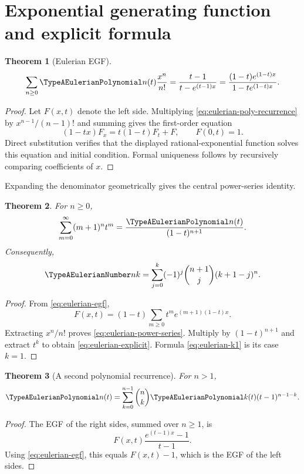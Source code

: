 \documentclass[11pt,a4paper,oneside,openany]{book}
\newtheorem{theorem}{Theorem}[chapter]
\theoremstyle{definition}
\theoremstyle{remark}
\begin{document}
\section{Exponential generating function and explicit formula}
\begin{theorem}[Eulerian EGF]\label{thm:eulerian-egf}
\begin{equation}\label{eq:eulerian-egf}
 \sum_{n\ge0}\TypeAEulerianPolynomial n(t)\frac{x^n}{n!}
 =\frac{t-1}{t-e^{(t-1)x}}
 =\frac{(1-t)e^{(1-t)x}}{1-te^{(1-t)x}}.
\end{equation}
\end{theorem}
\begin{proof}
Let $F(x,t)$ denote the left side.  Multiplying
\eqref{eq:eulerian-poly-recurrence} by $x^{n-1}/(n-1)!$ and summing gives the
first-order equation
\[
 (1-tx)F_x=t(1-t)F_t+F,
 \qquad F(0,t)=1.
\]
Direct substitution verifies that the displayed rational-exponential function
solves this equation and initial condition.  Formal uniqueness follows by
recursively comparing coefficients of $x$.
\end{proof}

Expanding the denominator geometrically gives the central power-series identity.
\begin{theorem}\label{thm:eulerian-power-series}
For $n\ge0$,
\begin{equation}\label{eq:eulerian-power-series}
 \sum_{m=0}^{\infty}(m+1)^n t^m
 =\frac{\TypeAEulerianPolynomial n(t)}{(1-t)^{n+1}}.
\end{equation}
Consequently,
\begin{equation}\label{eq:eulerian-explicit}
 \TypeAEulerianNumber nk=\sum_{j=0}^{k}(-1)^j\binom{n+1}{j}(k+1-j)^n.
\end{equation}
\end{theorem}
\begin{proof}
From \eqref{eq:eulerian-egf},
\[
 F(x,t)=(1-t)\sum_{m\ge0}t^m e^{(m+1)(1-t)x}.
\]
Extracting $x^n/n!$ proves \eqref{eq:eulerian-power-series}.  Multiply by
$(1-t)^{n+1}$ and extract $t^k$ to obtain
\eqref{eq:eulerian-explicit}.  Formula \eqref{eq:eulerian-k1} is its case $k=1$.
\end{proof}

\begin{theorem}[A second polynomial recurrence]\label{thm:eulerian-binomial-recurrence}
For $n>1$,
\begin{equation}\label{eq:eulerian-binomial-recurrence}
 \TypeAEulerianPolynomial n(t)=\sum_{k=0}^{n-1}\binom nk \TypeAEulerianPolynomial k(t)(t-1)^{n-1-k}.
\end{equation}
\end{theorem}
\begin{proof}
The EGF of the right sides, summed over $n\ge1$, is
\[
 F(x,t)\frac{e^{(t-1)x}-1}{t-1}.
\]
Using \eqref{eq:eulerian-egf}, this equals $F(x,t)-1$, which is the EGF of the
left sides.
\end{proof}
\end{document}
